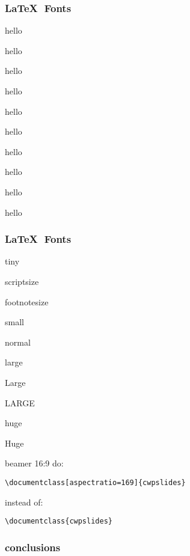 \begin{frame}\frametitle{\LaTeX$\text{ }$Fonts}
\centering
\tiny hello

\scriptsize hello

\footnotesize hello

\small hello

\normalsize hello

\large hello

\Large hello

\LARGE hello

\huge hello

\centering
\Huge hello

\end{frame}

\begin{frame}\frametitle{\LaTeX$\text{ }$Fonts}
\centering
\tiny tiny

\scriptsize scriptsize

\footnotesize footnotesize

\small small

\normalsize normal

\large large

\Large Large

\LARGE LARGE 

\huge huge

\Huge Huge

\end{frame}



\begin{frame}[fragile]{beamer 16:9}
do:
\begin{verbatim}
\documentclass[aspectratio=169]{cwpslides}
\end{verbatim}
instead of:
\begin{verbatim}
\documentclass{cwpslides}
\end{verbatim}

\end{frame}


\begin{frame}\frametitle{conclusions}

\vfill
{}
\vfill
{}
\vfill
{}
\end{frame}
